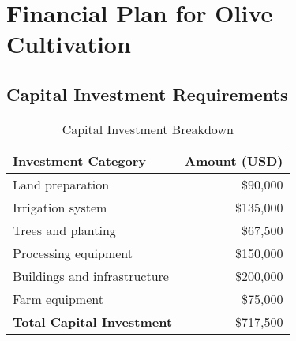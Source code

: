 \section{Financial Plan for Olive Cultivation}

\subsection{Capital Investment Requirements}

\begin{table}[h]
\centering
\begin{tabular}{|l|r|}
\hline
\textbf{Investment Category} & \textbf{Amount (USD)} \\
\hline
Land preparation & \$90,000 \\
Irrigation system & \$135,000 \\
Trees and planting & \$67,500 \\
Processing equipment & \$150,000 \\
Buildings and infrastructure & \$200,000 \\
Farm equipment & \$75,000 \\
\hline
\textbf{Total Capital Investment} & \$717,500 \\
\hline
\end{tabular}
\caption{Capital Investment Breakdown}
\end{table}

